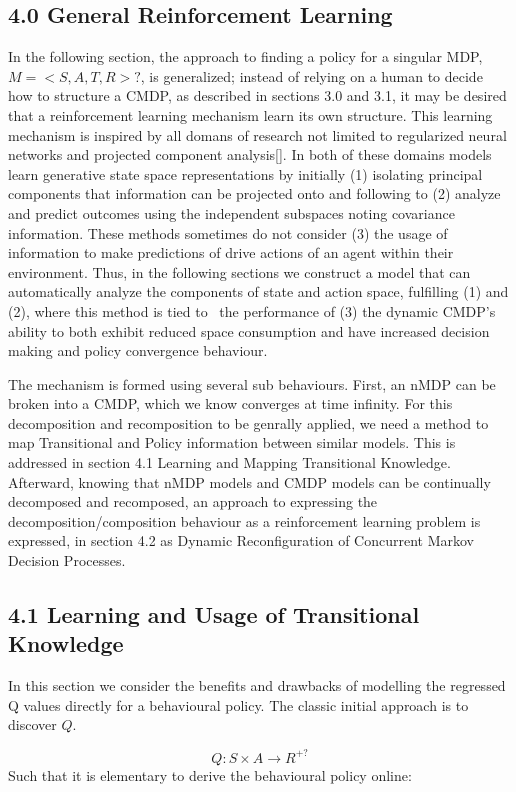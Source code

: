\documentclass{article}
\begin{document}
\subsection{4.0 General Reinforcement Learning}
In the following section, the approach to finding a policy for a singular MDP,  $M=<S,A,T,R>?$, is generalized; instead of relying on a human to decide how to structure a CMDP, as described in sections 3.0 and 3.1, it may be desired that a reinforcement learning mechanism learn its own structure. This learning mechanism is inspired by all domans of research not limited to regularized neural networks and projected component analysis[]. In both of these domains models learn generative state space representations by initially (1) isolating principal components that information can be projected onto and following to (2) analyze and predict outcomes using the independent subspaces noting covariance information. These methods sometimes do not consider (3) the usage of information to make predictions of drive actions of an agent within their environment. Thus, in the following sections we construct a model that can automatically analyze the components of state and action space, fulfilling (1) and (2), where this method is tied to \ the performance of (3) the dynamic CMDP's ability to both exhibit reduced space consumption and have increased decision making and policy convergence behaviour.

The mechanism is formed using several sub behaviours. First, an nMDP can be broken into a CMDP, which we know converges at time infinity. For this decomposition and recomposition to be genrally applied, we need a method to map Transitional and Policy information between similar models. This is addressed in section 4.1 Learning and Mapping Transitional Knowledge. Afterward, knowing that nMDP models and CMDP models can be continually decomposed and recomposed, an approach to expressing the decomposition/composition behaviour as a reinforcement learning problem is expressed, in section 4.2 as Dynamic Reconfiguration of Concurrent Markov Decision Processes.

\subsection{4.1 Learning and Usage of Transitional Knowledge}
In this section we consider the benefits and drawbacks of modelling the regressed Q values directly for a behavioural policy. The classic initial approach is to discover  $Q$.

\begin{equation}
Q:S\times A\rightarrow R^{+?}
\end{equation}
Such that it is elementary to derive the behavioural policy online:
\end{document}
